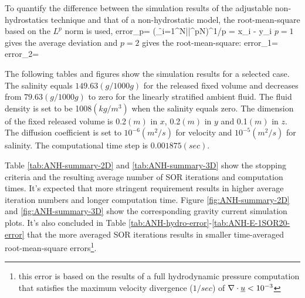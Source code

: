 To quantify the difference between the simulation results of the adjustable non-hydrostatics technique and that of a non-hydrostatic model, the root-mean-square based on the $L^p$ norm is used,
\be
error_p= \left(\f{\sum_{i=1}^{N}||^p}{N}\right)^{1/p}
\ee
\be
{} = x_i - y_i
\ee
$p=1$ gives the average deviation and $p=2$ gives the root-mean-square:
\be
error_1=
\ee
\be
error_2=
\ee

The following tables and figures show the simulation results for a selected case.
The salinity equals $149.63 (g/1000g)$ for the released fixed volume and
decreases from $79.63 (g/1000g)$ to zero for the linearly stratified ambient fluid. The fluid density is set to be 1008$(kg/m^3)$ when the salinity equals zero. The dimension of the fixed released volume is 0.2$(m)$ in $x$, 0.2$(m)$ in $y$ and 0.1$(m)$ in $z$. The diffusion coefficient is set to $10^{-6} (m^2/s)$ for velocity and $10^{-5} (m^2/s)$ for salinity. The computational time step is $0.001875 (sec)$.

Table \ref{tab:ANH-summary-2D} and \ref{tab:ANH-summary-3D} show the stopping criteria and the resulting average number of SOR iterations and computation times. It's expected that more stringent requirement results in higher average iteration numbers and longer computation time. Figure \ref{fig:ANH-summary-2D} and \ref{fig:ANH-summary-3D} show the corresponding gravity current simulation plots. It's also concluded in
Table \ref{tab:ANH-hydro-error}-\ref{tab:ANH-E-1SOR20-error}
that the more averaged SOR iterations results in smaller
time-averaged root-mean-square errors\footnote[1]{this error is based on the results of a full hydrodynamic pressure computation that satisfies the maximum velocity divergence ($1/sec$) of $\nabla \cdot \underline u<10^{-3}$}.

\cp

